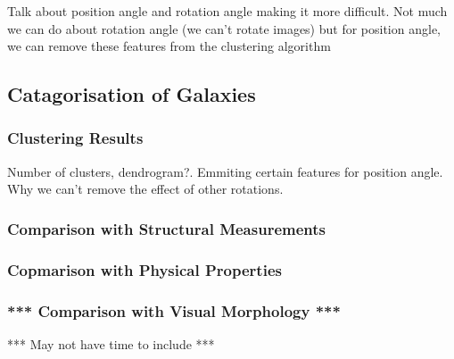 \documentclass[12pt, onecolumn]{article}
\begin{document}
        \vspace{5mm}
        

        Talk about position angle and rotation angle making it more difficult. Not much we can do about rotation angle (we can't rotate images) but for position angle, we can remove these features from the clustering algorithm
        


    \subsection{Catagorisation of Galaxies}

        \subsubsection{Clustering Results}

        Number of clusters, dendrogram?. Emmiting certain features for position angle. Why we can't remove the effect of other rotations.
        
        \subsubsection{Comparison with Structural Measurements}


        
        \subsubsection{Copmarison with Physical Properties}


        
        \subsubsection{*** Comparison with Visual Morphology ***}

        *** May not have time to include ***

    








    
        
\end{document}
